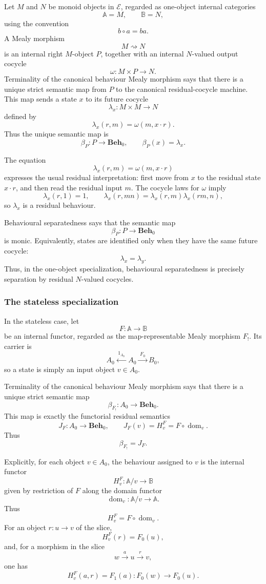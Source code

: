Let \(M\) and \(N\) be monoid objects in \(\mathcal E\), regarded as one-object internal categories
\[
    \mathbb A=M,
    \qquad
    \mathbb B=N,
\]
using the convention
\[
    b\circ a=ba.
\]
A Mealy morphism
\[
    M\rightsquigarrow N
\]
is an internal right \(M\)-object \(P\), together with an internal \(N\)-valued output cocycle
\[
    \omega:M\times P\to N.
\]
Terminality of the canonical behaviour Mealy morphism says that there is a unique strict semantic map from \(P\) to the canonical residual-cocycle machine. This map sends a state \(x\) to its future cocycle
\[
    \lambda_x:M\times M\to N
\]
defined by
\[
    \lambda_x(r,m)=\omega(m,x\cdot r).
\]
Thus the unique semantic map is
\[
    \beta_P:P\to \mathbf{Beh}_0,
    \qquad
    \beta_P(x)=\lambda_x.
\]

The equation
\[
    \lambda_x(r,m)=\omega(m,x\cdot r)
\]
expresses the usual residual interpretation: first move from \(x\) to the residual state \(x\cdot r\), and then read the residual input \(m\). The cocycle laws for \(\omega\) imply
\[
    \lambda_x(r,1)=1,
    \qquad
    \lambda_x(r,mn)=\lambda_x(r,m)\lambda_x(rm,n),
\]
so \(\lambda_x\) is a residual behaviour.

Behavioural separatedness says that the semantic map
\[
    \beta_P:P\to \mathbf{Beh}_0
\]
is monic. Equivalently, states are identified only when they have the same future cocycle:
\[
    \lambda_x=\lambda_y.
\]
Thus, in the one-object specialization, behavioural separatedness is precisely separation by residual \(N\)-valued cocycles.

\subsubsection{The stateless specialization}

In the stateless case, let
\[
    F:\mathbb A\to\mathbb B
\]
be an internal functor, regarded as the map-representable Mealy morphism \(F_!\). Its carrier is
\[
    A_0
        \xleftarrow{\;1_{A_0}\;}
    A_0
        \xrightarrow{\;F_0\;}
    B_0,
\]
so a state is simply an input object \(v\in A_0\).

Terminality of the canonical behaviour Mealy morphism says that there is a unique strict semantic map
\[
    \beta_{F_!}:A_0\to \mathbf{Beh}_0.
\]
This map is exactly the functorial residual semantics
\[
    J_F:A_0\to \mathbf{Beh}_0,
    \qquad
    J_F(v)=H^F_v=F\circ\operatorname{dom}_v.
\]
Thus
\[
    \beta_{F_!}=J_F.
\]

Explicitly, for each object \(v\in A_0\), the behaviour assigned to \(v\) is the internal functor
\[
    H^F_v:\mathbb A/v\to\mathbb B
\]
given by restriction of \(F\) along the domain functor
\[
    \operatorname{dom}_v:\mathbb A/v\to\mathbb A.
\]
Thus
\[
    H^F_v=F\circ\operatorname{dom}_v.
\]
For an object \(r:u\to v\) of the slice,
\[
    H^F_v(r)=F_0(u),
\]
and, for a morphism in the slice
\[
    w\xrightarrow{a}u\xrightarrow{r}v,
\]
one has
\[
    H^F_v(a,r)=F_1(a):F_0(w)\to F_0(u).
\]

